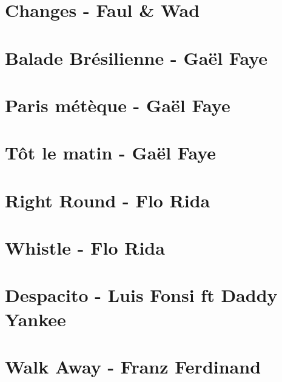 \documentclass[11pt]{article}
\begin{document}
\section{Changes - Faul \& Wad}
\begin{guitar}

\end{guitar}

\section{Balade Brésilienne - Gaël Faye}
\begin{guitar}

\end{guitar}


\section{Paris métèque - Gaël Faye}
\begin{guitar}

\end{guitar}


\section{Tôt le matin - Gaël Faye}
\begin{guitar}

\end{guitar}

\section{Right Round - Flo Rida}
\begin{guitar}

\end{guitar}


\section{Whistle - Flo Rida}
\begin{guitar}

\end{guitar}

\section{Despacito - Luis Fonsi ft Daddy Yankee}





\section{Walk Away - Franz Ferdinand}
\begin{guitar}

\end{guitar}
\end{document}
